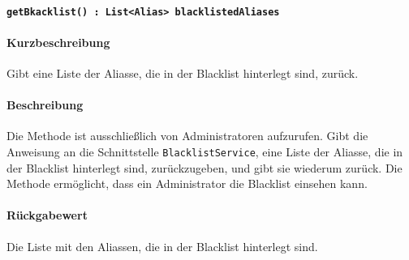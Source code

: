 \paragraph{\texttt{getBkacklist() : List<Alias> blacklistedAliases}}%
\paragraph*{Kurzbeschreibung}
Gibt eine Liste der Aliasse, die in der Blacklist hinterlegt sind, zurück.
\paragraph*{Beschreibung}
Die Methode ist ausschließlich von Administratoren aufzurufen.
Gibt die Anweisung an die Schnittstelle \texttt{BlacklistService}, eine Liste der Aliasse, die in der Blacklist hinterlegt sind, zurückzugeben, und gibt sie wiederum zurück.
Die Methode ermöglicht, dass ein Administrator die Blacklist einsehen kann.
\paragraph*{Rückgabewert}
Die Liste mit den Aliassen, die in der Blacklist hinterlegt sind.
